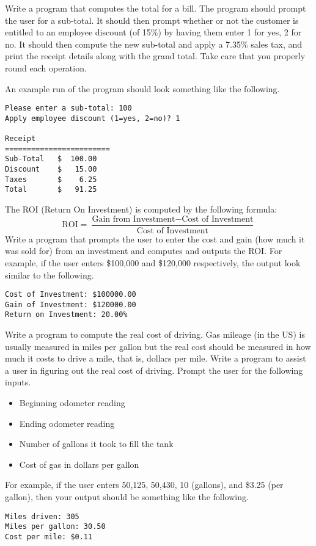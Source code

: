 \begin{exer}
Write a program that computes the total for a bill.  The program should prompt the user for a 
sub-total.  It should then prompt whether or not the customer is entitled to an employee discount (of 15\%) by 
having them enter 1 for yes, 2 for no.  It should then compute the new sub-total and apply a 7.35\% sales tax, and
print the receipt details along with the grand total.  Take care that you properly round each operation.

An example run of the program should look something like the following.

\begin{verbatim}
Please enter a sub-total: 100
Apply employee discount (1=yes, 2=no)? 1

Receipt
========================
Sub-Total   $  100.00
Discount    $   15.00
Taxes       $    6.25
Total       $   91.25
\end{verbatim}
\end{exer}


\begin{exer}
The ROI (Return On Investment) is computed by the following formula:
  $$\textrm{ROI} = \frac{\textrm{Gain from Investment} - \textrm{Cost of Investment}}{\textrm{Cost of Investment}}$$
Write a program that prompts the user to enter the cost and gain 
(how much it was sold for) from an investment and computes and
outputs the ROI.  For example, if the user enters \$100,000 and
\$120,000 respectively, the output look similar to the following.

\begin{verbatim}
Cost of Investment: $100000.00
Gain of Investment: $120000.00
Return on Investment: 20.00%
\end{verbatim}
\end{exer}

\begin{exer}
Write a program to compute the real cost of driving.  Gas
mileage (in the US) is usually measured in miles per gallon
but the real cost should be measured in how much it costs 
to drive a mile, that is, dollars per mile.  Write a program to 
assist a user in figuring out the real cost of driving.  Prompt 
the user for the following inputs.
\begin{itemize}
  \item Beginning odometer reading
  \item Ending odometer reading
  \item Number of gallons it took to fill the tank
  \item Cost of gas in dollars per gallon
\end{itemize}
For example, if the user enters 50,125, 50,430, 10 (gallons), 
and \$3.25 (per gallon), then your output should be something 
like the following.

\begin{verbatim}
Miles driven: 305
Miles per gallon: 30.50
Cost per mile: $0.11 
\end{verbatim}
\end{exer}

